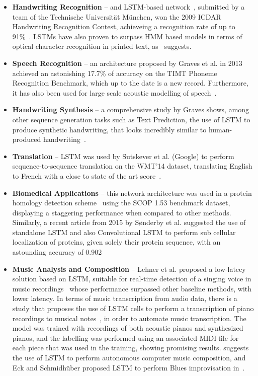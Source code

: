 \begin{itemize}
    \item \textbf{Handwriting Recognition} -- and LSTM-based network~\cite{Bertolami09}, submitted by a team of the Technische Universität München, won the 2009 ICDAR Handwriting Recognition Contest, achieveing a recognition rate of up to 91\%~\cite{ICDAR09}. LSTMs have also proven to surpass HMM based models in terms of optical character recognition in printed text, as~\cite{Breuel13} suggests.

    \item \textbf{Speech Recognition} -- an architecture\cite{Graves13} proposed by Graves et al. in 2013 achieved an astonishing 17.7\% of accuracy on the TIMT Phoneme Recognition Benchmark, which up to the date is a new record. Furthermore, it has also been used for large scale acoustic modelling of speech~\cite{Sak14}.

    \item \textbf{Handwriting Synthesis} -- a comprehensive study by Graves shows, among other sequence generation tasks such as Text Prediction, the use of LSTM to produce synthetic handwriting, that looks incredibly similar to human-produced handwriting~\cite{Graves13_2}.

    \item \textbf{Translation} -- LSTM was used by Sutskever et al. (Google) to perform sequence-to-sequence translation on the WMT'14 dataset, translating English to French with a close to state of the art score~\cite{Sustkever14}.

    \item \textbf{Biomedical Applications} -- this network architecture was used in a protein homology detection scheme~\cite{Hochreiter07} using the SCOP 1.53 benchmark dataset, displaying a staggering performance when compared to other methods. Similarly, a recent article from 2015 by Sønderby et al. suggested the use of standalone LSTM and also Convolutional LSTM to perform sub cellular localization of proteins, given solely their protein sequence, with an astounding accuracy of 0.902~\cite{Sonderby15}

    \item \textbf{Music Analysis and Composition} -- Lehner et al. proposed a low-latecy solution based on LSTM, suitable for real-time detection of a singing voice in music recordings~\cite{Lehner15} whose performance surpassed other baseline methods, with lower latency. 
        In terms of music transcription from audio data, there is a study that proposes the use of LSTM cells to perform a transcription of piano recordings to musical notes~\cite{Bock12}, in order to automate music transcription. The model was trained with recordings of both acoustic pianos and synthesized pianos, and the labelling was performed using an associated MIDI file for each piece that was used in the training, showing promising results. \cite{Coca13} suggests the use of LSTM to perform autonomous computer music composition, and Eck and Schmidhüber proposed LSTM to perform Blues improvisation in~\cite{Eck02}.


\end{itemize}
